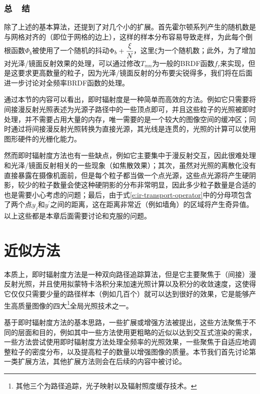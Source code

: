 



\subsubsection{总~~结}
除了上述的基本算法，\cite{a:InstantRadiosity}还提到了对几个小的扩展。首先霍尔顿系列产生的随机数是与网格对齐的（即位于网格的边上），这样的样本分布容易导致走样，为此每个倒根函数$\Phi_b$被使用了一个随机的抖动$\Phi_b+ \cfrac{\xi}{N}$，这里$\xi$为一个随机数；此外，为了增加对光泽/镜面反射效果的处理，可以通过修改$T_{mn}$为一般的BRDF函数$f_r$来实现，但是这要求更高数量的粒子，因为光泽/镜面反射的分布要尖锐得多，我们将在后面进一步讨论对全频率BRDF函数的处理。

通过本节的内容可以看出，即时辐射度是一种简单而高效的方法。例如它只需要将间接漫反射光照表述为光源子路径中的一些顶点即可，并且这些粒子的光照被即时处理，并不需要占用大量的内存，唯一需要的是一个较大的图像空间的缓冲区；同时通过将间接漫反射光照转换为直接光源，其光线是连贯的，光照的计算可以使用图形硬件的光栅化能力。

然而即时辐射度方法也有一些缺点，例如它主要集中于漫反射交互，因此很难处理和光泽/镜面反射相关的一些现象（如焦散效果）；其次，虽然对光照的离散化没有直接暴露在摄像机面前，但是每个粒子都当做一个点光源，这些点光源将产生硬阴影，较少的粒子数量会使这种硬阴影的分布非常明显，因此多少粒子数量是合适的也是需要小心考虑的问题；最后，由于式\ref{e:ir-transport-operator}中的分母项包含了两个点$y_j$和$y^{'}$之间的距离，这在距离非常近（例如墙角）的区域将产生奇异值。以上这些都是本章后面需要讨论和克服的问题。





\section{近似方法}\label{sec:ir-improved-algorithms}
本质上，即时辐射度方法是一种双向路径追踪算法，但是它主要聚焦于（间接）漫反射光照，并且使用拟蒙特卡洛积分来加速光照计算以及积分的收敛速度，这使得它仅仅只需要少量的路径样本（例如几百个）就可以达到很好的效果，它是能够产生高质量图像的四大\footnote{其他三个为路径追踪，光子映射以及辐射照度缓存技术。}全局光照技术之一。

基于即时辐射度方法的基本思路，一些扩展或增强方法被提出，这些方法聚焦于不同的层面和目的，例如其中一些方法使用更粗略的近似以达到交互式渲染的需求，一些方法尝试使用即时辐射度方法处理全频率的光照效果，一些聚焦于自适应地调整粒子的密度分布，以及提高粒子的数量以增强图像的质量。本节我们首先讨论第一类扩展方法，其他扩展方法则会在后续的内容中被讨论。




